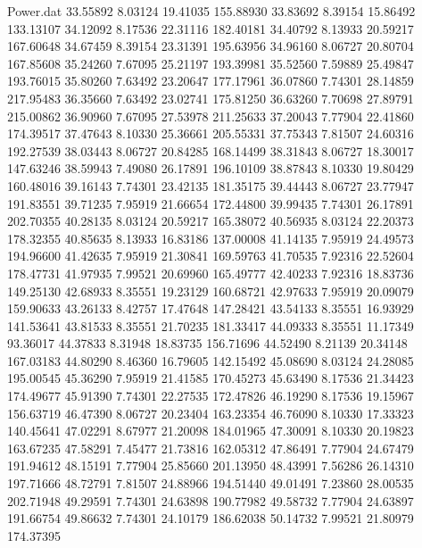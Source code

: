 \begin{filecontents}{Power.dat}
  33.55892    8.03124   19.41035  155.88930
  33.83692    8.39154   15.86492  133.13107
  34.12092    8.17536   22.31116  182.40181
  34.40792    8.13933   20.59217  167.60648
  34.67459    8.39154   23.31391  195.63956
  34.96160    8.06727   20.80704  167.85608
  35.24260    7.67095   25.21197  193.39981
  35.52560    7.59889   25.49847  193.76015
  35.80260    7.63492   23.20647  177.17961
  36.07860    7.74301   28.14859  217.95483
  36.35660    7.63492   23.02741  175.81250
  36.63260    7.70698   27.89791  215.00862
  36.90960    7.67095   27.53978  211.25633
  37.20043    7.77904   22.41860  174.39517
  37.47643    8.10330   25.36661  205.55331
  37.75343    7.81507   24.60316  192.27539
  38.03443    8.06727   20.84285  168.14499
  38.31843    8.06727   18.30017  147.63246
  38.59943    7.49080   26.17891  196.10109
  38.87843    8.10330   19.80429  160.48016
  39.16143    7.74301   23.42135  181.35175
  39.44443    8.06727   23.77947  191.83551
  39.71235    7.95919   21.66654  172.44800
  39.99435    7.74301   26.17891  202.70355
  40.28135    8.03124   20.59217  165.38072
  40.56935    8.03124   22.20373  178.32355
  40.85635    8.13933   16.83186  137.00008
  41.14135    7.95919   24.49573  194.96600
  41.42635    7.95919   21.30841  169.59763
  41.70535    7.92316   22.52604  178.47731
  41.97935    7.99521   20.69960  165.49777
  42.40233    7.92316   18.83736  149.25130
  42.68933    8.35551   19.23129  160.68721
  42.97633    7.95919   20.09079  159.90633
  43.26133    8.42757   17.47648  147.28421
  43.54133    8.35551   16.93929  141.53641
  43.81533    8.35551   21.70235  181.33417
  44.09333    8.35551   11.17349   93.36017
  44.37833    8.31948   18.83735  156.71696
  44.52490    8.21139   20.34148  167.03183
  44.80290    8.46360   16.79605  142.15492
  45.08690    8.03124   24.28085  195.00545
  45.36290    7.95919   21.41585  170.45273
  45.63490    8.17536   21.34423  174.49677
  45.91390    7.74301   22.27535  172.47826
  46.19290    8.17536   19.15967  156.63719
  46.47390    8.06727   20.23404  163.23354
  46.76090    8.10330   17.33323  140.45641
  47.02291    8.67977   21.20098  184.01965
  47.30091    8.10330   20.19823  163.67235
  47.58291    7.45477   21.73816  162.05312
  47.86491    7.77904   24.67479  191.94612
  48.15191    7.77904   25.85660  201.13950
  48.43991    7.56286   26.14310  197.71666
  48.72791    7.81507   24.88966  194.51440
  49.01491    7.23860   28.00535  202.71948
  49.29591    7.74301   24.63898  190.77982
  49.58732    7.77904   24.63897  191.66754
  49.86632    7.74301   24.10179  186.62038
  50.14732    7.99521   21.80979  174.37395

\end{filecontents}
